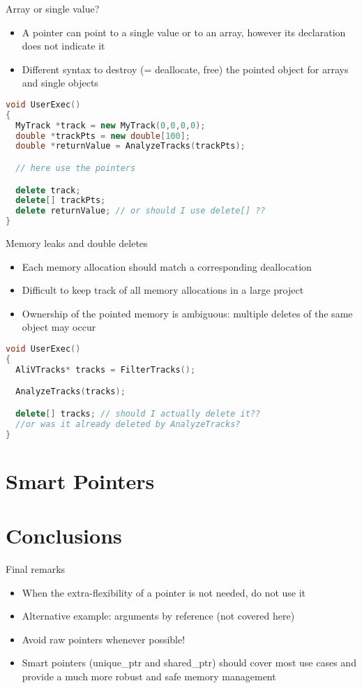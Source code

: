 \documentclass[xcolor={usenames,dvipsnames}]{beamer}
\begin{document}
\begin{frame}[fragile]{Array or single value?}
\begin{itemize}
\item A pointer can point to a single value or to an array, however its declaration does not indicate it
\item Different syntax to destroy (= deallocate, free) the pointed object for arrays and single objects 
\end{itemize}
\scriptsize
\begin{lstlisting}[language=C++]
void UserExec()
{
  MyTrack *track = new MyTrack(0,0,0,0);
  double *trackPts = new double[100];
  double *returnValue = AnalyzeTracks(trackPts);

  // here use the pointers

  delete track;
  delete[] trackPts;
  delete returnValue; // or should I use delete[] ??
}
\end{lstlisting}
\end{frame}

\begin{frame}[fragile]{Memory leaks and double deletes}
\begin{itemize}
\item Each memory allocation should match a corresponding deallocation
\item Difficult to keep track of all memory allocations in a large project
\item Ownership of the pointed memory is ambiguous: multiple deletes of the same object may occur
\end{itemize}
\scriptsize
\begin{lstlisting}[language=C++]
void UserExec()
{
  AliVTracks* tracks = FilterTracks();

  AnalyzeTracks(tracks);

  delete[] tracks; // should I actually delete it?? 
  //or was it already deleted by AnalyzeTracks?
}
\end{lstlisting}
\end{frame}

\section{Smart Pointers}

\section{Conclusions}

\begin{frame}{Final remarks}
\begin{itemize}
\item When the extra-flexibility of a pointer is not needed, do not use it
\item Alternative example: arguments  by reference (not covered here)
\item Avoid raw pointers whenever possible!
\item Smart pointers (unique\_ptr and shared\_ptr) should cover most use cases and provide
a much more robust and safe memory management
\end{itemize}
\end{frame}
\end{document}
